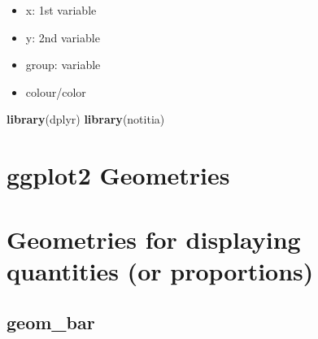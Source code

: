 \documentclass[]{book}
\newenvironment{Shaded}{\begin{snugshade}}{\end{snugshade}}
\newcommand{\KeywordTok}[1]{\textcolor[rgb]{0.13,0.29,0.53}{\textbf{#1}}}
\newcommand{\NormalTok}[1]{#1}
\providecommand{\tightlist}{%
  \setlength{\itemsep}{0pt}\setlength{\parskip}{0pt}}
\begin{document}
\begin{itemize}
\tightlist
\item
  x: 1st variable
\item
  y: 2nd variable\\
\item
  group: variable
\item
  colour/color
\end{itemize}

\begin{Shaded}
\begin{Highlighting}[]
\KeywordTok{library}\NormalTok{(dplyr)}
\KeywordTok{library}\NormalTok{(notitia)}
\end{Highlighting}
\end{Shaded}

\hypertarget{gggeoms}{%
\section*{ggplot2 Geometries}\label{gggeoms}}

\hypertarget{geomquant}{%
\section*{Geometries for displaying quantities (or proportions)}\label{geomquant}}

\hypertarget{geombar}{%
\subsection*{\texorpdfstring{\textbf{geom\_bar}}{geom\_bar}}\label{geombar}}
\end{document}
